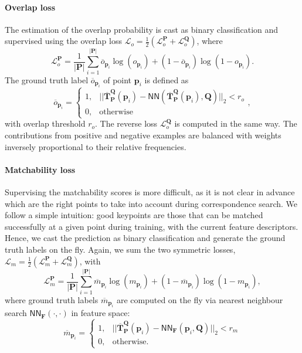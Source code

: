 \paragraph{Overlap loss}
The estimation of the overlap probability is cast as binary classification and supervised using the overlap loss $\mathcal{L}_o\!=\!\frac{1}{2} (\mathcal{L}^\mathbf{P}_o + \mathcal{L}^\mathbf{Q}_o)$, where 
\begin{equation}
\mathcal{L}^\mathbf{P}_o = \frac{1}{|\mathbf{P}|} \sum_{i=1}^{|\mathbf{P}|} \overbar{o}_{\mathbf{p}_i}\log(o_{\mathbf{p}_i}) + (1 - \overbar{o}_{\mathbf{p}_i})\log(1 - o_{\mathbf{p}_i}).
\end{equation}
The ground truth label $\overbar{o}_{\mathbf{p}_i}$ of point $\mathbf{p}_i$ is defined as
\begin{equation}
    \overbar{o}_{\mathbf{p}_i} =     
    \begin{cases}
      1, & ||\overbar{\mathbf{T}}_\mathbf{P}^\mathbf{Q}(\mathbf{p}_i) - \mathsf{NN}(\overbar{\mathbf{T}}_\mathbf{P}^\mathbf{Q}(\mathbf{p}_i),\mathbf{Q}) ||_2 < r_o \\
      0, & \text{otherwise}
    \end{cases},
\end{equation}
with overlap threshold $r_o$. The reverse loss $\mathcal{L}_o^\mathbf{Q}$ is computed in the same way.
The contributions from positive and negative examples are balanced with weights inversely proportional to their relative frequencies.

\paragraph{Matchability loss}
Supervising the matchability scores is more difficult, as it is not clear in advance which are the right points to take into account during correspondence search.
We follow a simple intuition: good keypoints are those that can be matched successfully at a given point during training, with the current feature descriptors.
Hence, we cast the prediction as binary classification and generate the ground truth labels on the fly.
Again, we sum the two symmetric losses, $\mathcal{L}_m = \frac{1}{2} (\mathcal{L}^\mathbf{P}_m + \mathcal{L}^\mathbf{Q}_m)$, with
\begin{equation}
\mathcal{L}^\mathbf{P}_m\!= \frac{1}{|\mathbf{P}|} \sum_{i=1}^{|\mathbf{P}|} \overbar{m}_{\mathbf{p}_i}\log(m_{\mathbf{p}_i})+(1-\overbar{m}_{\mathbf{p}_i})\log(1-m_{\mathbf{p}_i}),
\end{equation}
where ground truth labels $\overbar{m}_{\mathbf{p}_i}$ are computed on the fly via nearest neighbour search $\mathsf{NN}_\mathbf{F}(\cdot,\cdot)$ in feature space:
\begin{equation}
    \overbar{m}_{\mathbf{p}_i}\!=     
    \begin{cases}
      1, & ||\overbar{\mathbf{T}}_\mathbf{P}^\mathbf{Q}(\mathbf{p}_i)\!-\!\mathsf{NN}_\mathbf{F}(\mathbf{p}_i,\mathbf{Q}) ||_2\!<\!r_m \\
      0, & \text{otherwise}.
    \end{cases}
\end{equation} 

